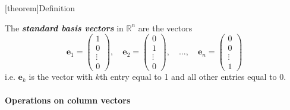 \documentclass[12pt]{report}
\theoremstyle{definition}
\begin{document}
[theorem]{Definition}
\begin{standard basis vector}
    The \textbf{\emph{standard basis vectors}} in $\mathbb{R}^{n}$ are the vectors\[
        \pmb{e}_1 = \begin{pmatrix}
                1\\
                0\\
                \vdots\\
                0
        \end{pmatrix}, \quad
        \pmb{e}_2 = \begin{pmatrix}
                0\\
                1\\
                \vdots\\
                0
        \end{pmatrix}, \quad \ldots, \quad
        \pmb{e}_n = \begin{pmatrix}
                0\\
                0\\
                \vdots\\
                1
        \end{pmatrix}
    \]
    i.e. $\pmb{e}_k$ is the vector with $k$th entry equal to 1 and all other entries equal to 0.
\end{standard basis vector}

\paragraph{Operations on column vectors}
\end{document}
